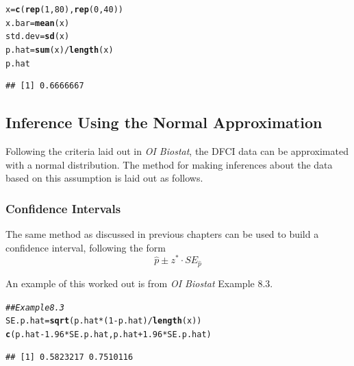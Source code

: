 \documentclass{report}\usepackage[]{graphicx}\usepackage[]{color}
\makeatletter
\newcommand{\hlnum}[1]{\textcolor[rgb]{0.686,0.059,0.569}{#1}}%
\newcommand{\hlcom}[1]{\textcolor[rgb]{0.678,0.584,0.686}{\textit{#1}}}%
\newcommand{\hlopt}[1]{\textcolor[rgb]{0,0,0}{#1}}%
\newcommand{\hlstd}[1]{\textcolor[rgb]{0.345,0.345,0.345}{#1}}%
\newcommand{\hlkwb}[1]{\textcolor[rgb]{0.69,0.353,0.396}{#1}}%
\newcommand{\hlkwd}[1]{\textcolor[rgb]{0.737,0.353,0.396}{\textbf{#1}}}%
\newenvironment{kframe}{%
 \def\at@end@of@kframe{}%
 \ifinner\ifhmode%
  \def\at@end@of@kframe{\end{minipage}}%
  \begin{minipage}{\columnwidth}%
 \fi\fi%
 \def\FrameCommand##1{\hskip\@totalleftmargin \hskip-\fboxsep
 \colorbox{shadecolor}{##1}\hskip-\fboxsep
     \hskip-\linewidth \hskip-\@totalleftmargin \hskip\columnwidth}%
 \MakeFramed {\advance\hsize-\width
   \@totalleftmargin\z@ \linewidth\hsize
   \@setminipage}}%
 {\par\unskip\endMakeFramed%
 \at@end@of@kframe}
\newenvironment{knitrout}{}{} %
\makeatother
\begin{document}
\begin{knitrout}
\color{fgcolor}\begin{kframe}
\begin{alltt}
\hlstd{x} \hlkwb{=} \hlkwd{c}\hlstd{(}\hlkwd{rep}\hlstd{(}\hlnum{1}\hlstd{,}\hlnum{80}\hlstd{),}\hlkwd{rep}\hlstd{(}\hlnum{0}\hlstd{,}\hlnum{40}\hlstd{))}
\hlstd{x.bar} \hlkwb{=} \hlkwd{mean}\hlstd{(x)}
\hlstd{std.dev} \hlkwb{=} \hlkwd{sd}\hlstd{(x)}
\hlstd{p.hat} \hlkwb{=} \hlkwd{sum}\hlstd{(x)}\hlopt{/}\hlkwd{length}\hlstd{(x)}
\hlstd{p.hat}
\end{alltt}
\begin{verbatim}
## [1] 0.6666667
\end{verbatim}
\end{kframe}
\end{knitrout}

\subsection{Inference Using the Normal Approximation}
Following the criteria laid out in \textit{OI Biostat}, the DFCI data can be approximated with a normal distribution.  The method for making inferences about the data based on this assumption is laid out as follows.  

\subsubsection{Confidence Intervals}
The same method as discussed in previous chapters can be used to build a confidence interval, following the form 
\[ \hat{p} \pm z^* \cdot SE_{\hat{p}}\]

An example of this worked out is from \textit{OI Biostat} Example 8.3.  
\begin{knitrout}
\color{fgcolor}\begin{kframe}
\begin{alltt}
\hlcom{## Example 8.3}
\hlstd{SE.p.hat} \hlkwb{=} \hlkwd{sqrt}\hlstd{(p.hat}\hlopt{*}\hlstd{(}\hlnum{1}\hlopt{-}\hlstd{p.hat)}\hlopt{/}\hlkwd{length}\hlstd{(x))}
\hlkwd{c}\hlstd{(p.hat} \hlopt{-} \hlnum{1.96}\hlopt{*}\hlstd{SE.p.hat, p.hat} \hlopt{+}  \hlnum{1.96}\hlopt{*}\hlstd{SE.p.hat)}
\end{alltt}
\begin{verbatim}
## [1] 0.5823217 0.7510116
\end{verbatim}
\end{kframe}
\end{knitrout}
\end{document}
